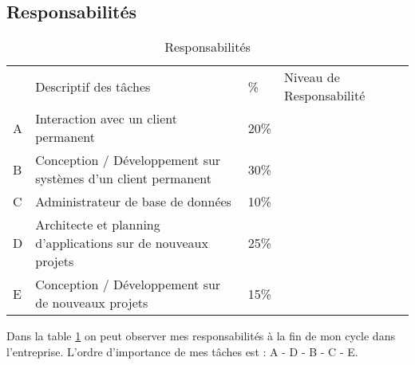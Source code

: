 \documentclass{resume} %
\begin{document}
	\subsection{Responsabilités}

\newcommand{\uno}{\ding{172}\ }
\newcommand{\dos}{\ding{173}\ }
\newcommand{\tres}{\ding{174}\ }
\newcommand{\cuatro}{\ding{175}\ }

\newcommand{\UNO}{\ding{202}\ }
\newcommand{\DOS}{\ding{203}\ }
\newcommand{\TRES}{\ding{204}\ }
\newcommand{\CUATRO}{\ding{205}\ }


\begin{table}[!htbp]
\label{table-aufiero}
\begin{tabular}{|l|l|l|l|l}
\cline{1-4}
   & Descriptif des tâches &  \% & Niveau de Responsabilité \footnotemark &  \\ \cline{1-4}
 A& Interaction avec un client permanent & 20\% & \uno \dos \tres \CUATRO &  \\ \cline{1-4}
 B& Conception / Développement sur systèmes d'un client permanent & 30\%&  \uno \dos \tres \CUATRO &  \\ \cline{1-4}
 C& Administrateur de base de données  & 10\%  & \uno \dos \TRES \cuatro  &  \\ \cline{1-4}
 D& Architecte et planning d'applications sur de nouveaux projets & 25\% & \uno \dos \TRES \cuatro &  \\ \cline{1-4}
 E& Conception / Développement sur de nouveaux projets & 15\% &\uno \DOS \tres \cuatro&  \\ \cline{1-4}
\end{tabular}

\caption{Responsabilités}
\end{table}
Dans la table \ref{table-aufiero} on peut observer mes responsabilités  \`a la fin de mon cycle dans l'entreprise.
L'ordre d'importance de mes tâches est : A - D - B - C - E. 

\end{document}
